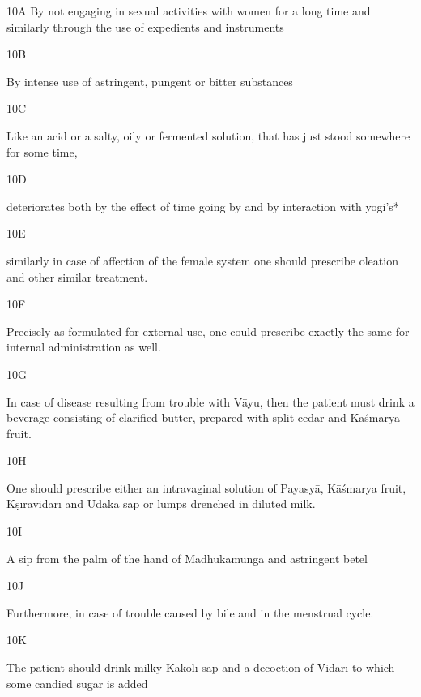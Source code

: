 \begin{translation}
\begin{tt}
  
  
\item[10A]  By not engaging in sexual activities with women for a long time and 
similarly 
  through the use of expedients and instruments
  
\item[10B]

By intense use of astringent, pungent or bitter substances
  
\item[10C]

Like an acid or a salty, oily or fermented solution, that has just stood 
  somewhere for some time,
  
\item[10D]

deteriorates both by the effect of time going by and by interaction with 
  yogi’s*  
  
\item[10E]

similarly in case of affection of the female system one should prescribe 
  oleation and other  similar treatment.
  
\item[10F]

Precisely as formulated for external use, one could prescribe exactly 
  the same for internal administration as well.
  
\item[10G]

In case of disease resulting from trouble with Vāyu, then the patient 
  must drink a beverage consisting of clarified butter, prepared with split cedar 
  and Kāśmarya fruit.
  
\item[10H]

One should prescribe either an intravaginal solution of Payasyā, 
  Kāśmarya fruit, Kṣīravidārī and Udaka sap or lumps drenched in diluted milk.
  
\item[10I]

A sip from the palm of the hand of Madhukamunga and astringent betel
  
\item[10J]

Furthermore, in case of trouble caused by bile and in the menstrual 
  cycle.
  
\item[10K]

The patient should drink milky Kākolī sap and a decoction of Vidārī to 
  which some candied sugar is added
  

\end{tt}
\end{translation}
